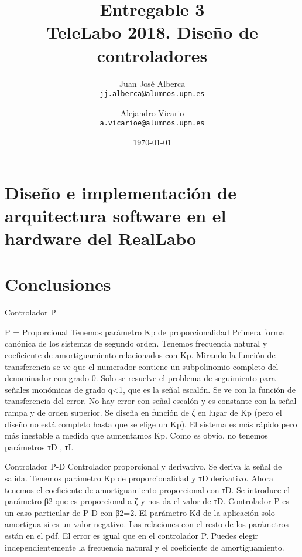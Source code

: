 \documentclass[a4paper]{article}
\begin{document}
\title{Entregable 3 \\
\large TeleLabo 2018. Diseño de controladores}
\author{
	Juan José Alberca\\
	\texttt{jj.alberca@alumnos.upm.es}
	\and
	Alejandro Vicario\\
	\texttt{a.vicarioe@alumnos.upm.es}
}
\date{\today}


\maketitle


\section{Diseño e implementación de arquitectura software en el hardware del RealLabo}


\section{Conclusiones}

Controlador P

P = Proporcional
Tenemos parámetro Kp de proporcionalidad
Primera forma canónica de los sistemas de segundo orden.
Tenemos frecuencia natural y coeficiente de amortiguamiento relacionados con Kp.
Mirando la función de transferencia se ve que el numerador contiene un subpolinomio completo del denominador con grado 0. Solo se resuelve el problema de seguimiento para señales monómicas de grado q<1, que es la señal escalón. Se ve con la función de transferencia del error. No hay error con señal escalón y es constante con la señal rampa y de orden superior.
Se diseña en función de ζ en lugar de Kp (pero el diseño no está completo hasta que se elige un Kp).
El sistema es más rápido pero más inestable a medida que aumentamos Kp.
Como es obvio, no tenemos parámetros τD , τI.

Controlador P-D
Controlador proporcional y derivativo. Se deriva la señal de salida.
Tenemos parámetro Kp de proporcionalidad y  τD derivativo.
Ahora tenemos el coeficiente de amortiguamiento proporcional con  τD.
Se introduce el parámetro β2 que es proporcional a  ζ y nos da el valor de  τD.
Controlador P es un caso particular de P-D con  β2=2.
El parámetro Kd de la aplicación solo amortigua si es un valor negativo. Las relaciones con el resto de los parámetros están en el pdf.
El error es igual que en el controlador P.
Puedes elegir independientemente la frecuencia natural y el coeficiente de amortiguamiento.
\end{document}
